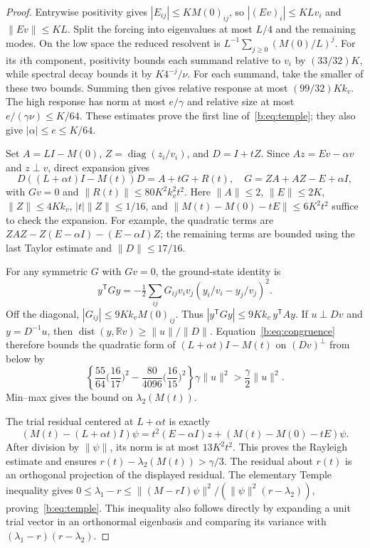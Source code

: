 \documentclass[11pt]{amsart}
\theoremstyle{definition}\newtheorem{definition}[theorem]{Definition}
\theoremstyle{remark}\newtheorem{remark}[theorem]{Remark}
\numberwithin{equation}{section}
\newcommand{\R}{\mathbb R}
\newcommand{\diag}{\operatorname{diag}}
\newcommand{\T}{\mathsf T}
\begin{document}
\begin{proof}
Entrywise positivity gives $|E_{ij}|\le KM(0)_{ij}$, so
$|(Ev)_i|\le KLv_i$ and $\|Ev\|\le KL$.
Split the forcing into eigenvalues at most $L/4$ and the remaining modes.
On the low space the reduced resolvent is
$L^{-1}\sum_{j\ge0}(M(0)/L)^j$.
For its $i$th component, positivity bounds each summand relative to $v_i$
by $(33/32)K$, while spectral decay bounds it by $K4^{-j}/\nu$.
For each summand, take the smaller of these two bounds. Summing then
gives relative response at most
$(99/32)Kk_v$. The high response has norm at most $e/\gamma$ and relative
size at most $e/(\gamma\nu)\le K/64$.
These estimates prove the first line of~\eqref{b:eq:temple}; they also give
$|\alpha|\le e\le K/64$.

Set $A=LI-M(0)$, $Z=\diag(z_i/v_i)$, and $D=I+tZ$.
Since $Az=Ev-\alpha v$ and $z\perp v$, direct expansion gives
\begin{equation}\label{b:eq:congruence}
 D((L+\alpha t)I-M(t))D=A+tG+R(t),\quad
 G=ZA+AZ-E+\alpha I,
\end{equation}
with $Gv=0$ and $\|R(t)\|\le80K^2k_v^2t^2$.
Here $\|A\|\le2$, $\|E\|\le2K$, $\|Z\|\le4Kk_v$,
$|t|\|Z\|\le1/16$, and
$\|M(t)-M(0)-tE\|\le6K^2t^2$ suffice to check the expansion.
For example, the quadratic terms are $ZAZ-Z(E-\alpha I)-(E-\alpha I)Z$;
the remaining terms are bounded using the last Taylor estimate and
$\|D\|\le17/16$.

For any symmetric $G$ with $Gv=0$, the ground-state identity is
\[
 y^\T Gy=-\tfrac12\sum_{ij}G_{ij}v_iv_j
                (y_i/v_i-y_j/v_j)^2.
\]
Off the diagonal, $|G_{ij}|\le9Kk_vM(0)_{ij}$. Thus
$|y^\T Gy|\le9Kk_v\,y^\T Ay$.
If $u\perp Dv$ and $y=D^{-1}u$, then
$\operatorname{dist}(y,\R v)\ge\|u\|/\|D\|$.
Equation~\eqref{b:eq:congruence} therefore bounds the quadratic form of
$(L+\alpha t)I-M(t)$ on $(Dv)^\perp$ from below by
\[
 \left\{\frac{55}{64}\Big(\frac{16}{17}\Big)^2
       -\frac{80}{4096}\Big(\frac{16}{15}\Big)^2\right\}
       \gamma\|u\|^2>\frac\gamma2\|u\|^2.
\]
Min--max gives the bound on $\lambda_2(M(t))$.

The trial residual centered at $L+\alpha t$ is exactly
\[
 (M(t)-(L+\alpha t)I)\psi
 =t^2(E-\alpha I)z+(M(t)-M(0)-tE)\psi.
\]
After division by $\|\psi\|$, its norm is at most $13K^2t^2$.
This proves the Rayleigh estimate and ensures
$r(t)-\lambda_2(M(t))>\gamma/3$.
The residual about $r(t)$ is an orthogonal projection of the displayed
residual. The elementary Temple inequality gives
$0\le\lambda_1-r\le\|(M-rI)\psi\|^2/(\|\psi\|^2(r-\lambda_2))$,
proving~\eqref{b:eq:temple}. This inequality also follows directly by expanding
a unit trial vector in an orthonormal eigenbasis and comparing its variance
with $(\lambda_1-r)(r-\lambda_2)$.


\end{proof}
\end{document}
